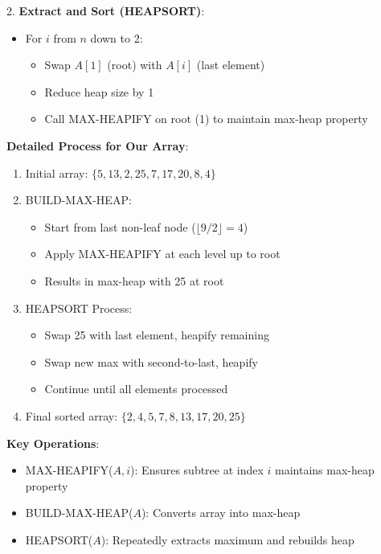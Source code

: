 2. \textbf{Extract and Sort (HEAPSORT)}:
   \begin{itemize}
      \item For $i$ from $n$ down to 2:
         \begin{itemize}
            \item Swap $A[1]$ (root) with $A[i]$ (last element)
            \item Reduce heap size by 1
            \item Call MAX-HEAPIFY on root (1) to maintain max-heap property
         \end{itemize}
   \end{itemize}

\textbf{Detailed Process for Our Array}:
\begin{enumerate}[label=\arabic*.]
    \item Initial array: $\{5, 13, 2, 25, 7, 17, 20, 8, 4\}$
    \item BUILD-MAX-HEAP:
       \begin{itemize}
          \item Start from last non-leaf node ($\lfloor 9/2 \rfloor = 4$)
          \item Apply MAX-HEAPIFY at each level up to root
          \item Results in max-heap with 25 at root
       \end{itemize}
    \item HEAPSORT Process:
       \begin{itemize}
          \item Swap 25 with last element, heapify remaining
          \item Swap new max with second-to-last, heapify
          \item Continue until all elements processed
       \end{itemize}
    \item Final sorted array: $\{2, 4, 5, 7, 8, 13, 17, 20, 25\}$
\end{enumerate}

\textbf{Key Operations}:
\begin{itemize}
    \item MAX-HEAPIFY($A,i$): Ensures subtree at index $i$ maintains max-heap property
    \item BUILD-MAX-HEAP($A$): Converts array into max-heap
    \item HEAPSORT($A$): Repeatedly extracts maximum and rebuilds heap
\end{itemize}

